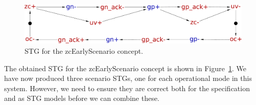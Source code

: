 \documentclass[british,compsoc]{IEEEtran}
\begin{document}
\begin{center}
\begin{figure}[H]
\begin{centering}
\includegraphics[scale=0.22]{Images/stg-UV_after_ZC}
\par\end{centering}

\protect\caption{\label{fig:zcEarlyScenario STG}STG for the \textsf{zcEarlyScenario}
concept.}
\end{figure}

\par\end{center}


The obtained STG for the \textsf{zcEarlyScenario} concept is shown
in Figure~\ref{fig:zcEarlyScenario STG}. We have now produced three
scenario STGs, one for each operational mode in this system. However,
we need to ensure they are correct both for the specification and
as STG models before we can combine these.
\end{document}

